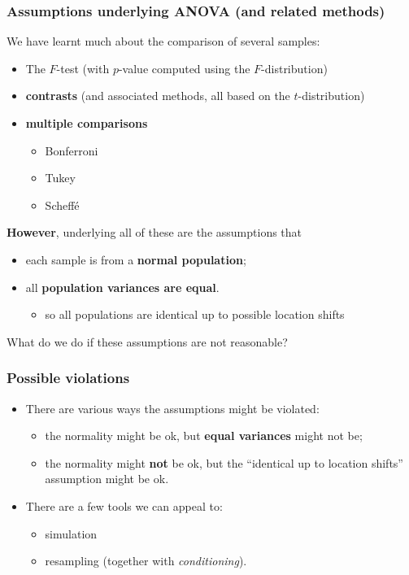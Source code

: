 \documentclass[a4paper]{article}\usepackage[]{graphicx}\usepackage[]{xcolor}
\begin{document}
\subsubsection{Assumptions underlying ANOVA (and related methods)}
We have learnt much about the comparison of several samples:
\begin{itemize}
	\item The \( F \)-test (with \( p \)-value computed using the \( F \)-distribution)
	\item \textcolor{mygreen}{\textbf{contrasts}} (and associated methods, all based on the \( t \)-distribution)
	\item \textcolor{mygreen}{\textbf{multiple comparisons}}
	\begin{itemize}
		\item Bonferroni
		\item Tukey
		\item Scheffé
	\end{itemize}
\end{itemize}
\textbf{However}, underlying all of these are the assumptions that
\begin{itemize}
	\item each sample is from a \textcolor{myred}{\textbf{normal population}};
	\item all \textcolor{myred}{\textbf{population variances are equal}}.
	\begin{itemize}
		\item so all populations are identical up to possible location shifts
	\end{itemize}
\end{itemize}
What do we do if these assumptions are not reasonable?
\subsubsection{Possible violations}
\begin{itemize}
	\item There are various ways the assumptions might be violated:
	\begin{itemize}
		\item the normality might be ok, but \textbf{equal variances} might not be;
		\item the normality might \textbf{not} be ok, but the ``identical up to location shifts'' assumption might be ok.
	\end{itemize}
	\item There are a few tools we can appeal to:
	\begin{itemize}
		\item simulation
		\item resampling (together with \textit{conditioning}).
	\end{itemize}
\end{itemize}
\end{document}

